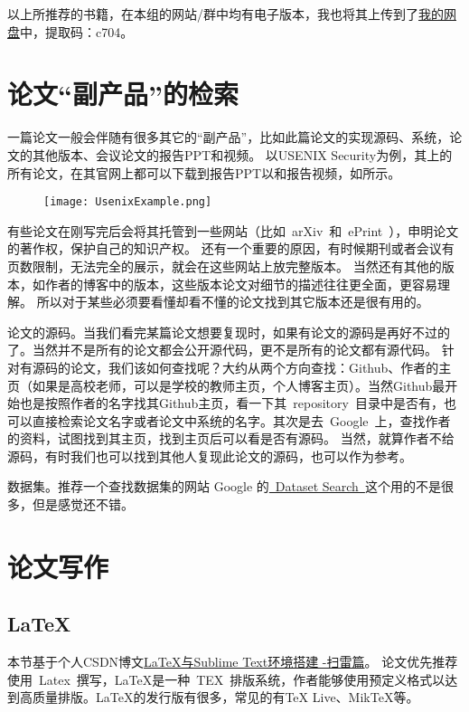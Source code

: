 \documentclass[lang=cn,11pt,a4paper]{elegantpaper}
\begin{document}
以上所推荐的书籍，在本组的网站/群中均有电子版本，我也将其上传到了\href{https://pan.baidu.com/s/1Z-PE5qZdd7RmlNwIYpFNtQ 
}{我的网盘}中，提取码：c704。

\section{论文“副产品”的检索}
一篇论文一般会伴随有很多其它的“副产品”，比如此篇论文的实现源码、系统，论文的其他版本、会议论文的报告PPT和视频。
以USENIX Security为例，其上的所有论文，在其官网上都可以下载到报告PPT以和报告视频，如所示。
\begin{figure}[!htb]
\centering
\texttt{[image: UsenixExample.png]}
\caption{}
\label{fig.UsenixExample}
\end{figure}

有些论文在刚写完后会将其托管到一些网站（比如~arXiv~和~ePrint~），申明论文的著作权，保护自己的知识产权。
还有一个重要的原因，有时候期刊或者会议有页数限制，无法完全的展示，就会在这些网站上放完整版本。
当然还有其他的版本，如作者的博客中的版本，这些版本论文对细节的描述往往更全面，更容易理解。
所以对于某些必须要看懂却看不懂的论文找到其它版本还是很有用的。

论文的源码。当我们看完某篇论文想要复现时，如果有论文的源码是再好不过的了。当然并不是所有的论文都会公开源代码，更不是所有的论文都有源代码。
针对有源码的论文，我们该如何查找呢？大约从两个方向查找：Github、作者的主页（如果是高校老师，可以是学校的教师主页，个人博客主页）。当然Github最开始也是按照作者的名字找其Github主页，看一下其~repository~目录中是否有，也可以直接检索论文名字或者论文中系统的名字。其次是去~Google~上，查找作者的资料，试图找到其主页，找到主页后可以看是否有源码。
当然，就算作者不给源码，有时我们也可以找到其他人复现此论文的源码，也可以作为参考。

数据集。推荐一个查找数据集的网站 Google 的\href{https://datasetsearch.research.google.com/}{~Dataset Search~}这个用的不是很多，但是感觉还不错。

\section{论文写作}
\subsection{\LaTeX}
本节基于个人CSDN博文\href{https://blog.csdn.net/qq_40115871/article/details/105901765}{LaTeX与Sublime Text环境搭建 -扫雷篇}。
论文优先推荐使用~Latex~撰写，\LaTeX 是一种~TEX~排版系统，作者能够使用预定义格式以达到高质量排版。LaTeX的发行版有很多，常见的有TeX Live、MikTeX等。
\end{document}
